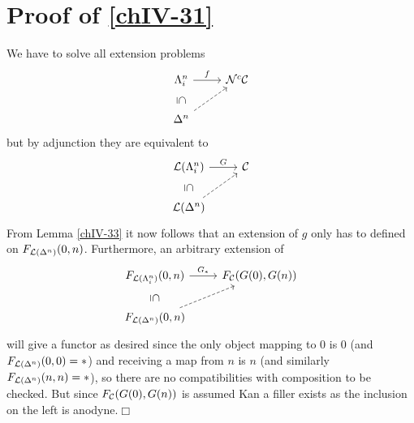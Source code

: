     \section{Proof of \ref{chIV-31}}
        We have to solve all extension problems
        \begin{equation*}
              \begin{tikzcd}
                \horn{n}{i} \arrow[r, "f"] \arrow[d, phantom, "\subseteq" rotate=-90] & \Nn^c \Cc \\
                \Delta^n \arrow[ru, dashed]           &        
            \end{tikzcd}
        \end{equation*}
        but by adjunction they are equivalent to
        \begin{equation*}
              \begin{tikzcd}
                \Ll(\horn{n}{i}) \arrow[r, "G"] \arrow[d, phantom, "\subseteq" rotate=-90] & \Cc \\
                \Ll(\Delta^n) \arrow[ru, dashed]           &        
            \end{tikzcd}
        \end{equation*}
        From Lemma \ref{chIV-33} it now follows that an extension of $g$ only has to defined on $F_{\mathcal{L}(\Delta^n)}(0,n)$. Furthermore, an arbitrary extension of
        \begin{equation*}
              \begin{tikzcd}
                F_{\Ll(\horn{n}{i})}(0, n) \arrow[r, "G_{*}"] \arrow[d, phantom, "\subseteq" rotate=-90] & F_{\Cc}(G(0), G(n)) \\
                F_{\Ll(\Delta^n)}(0, n) \arrow[ru, dashed]           &        
            \end{tikzcd}
        \end{equation*}
        will give a functor as desired since the only object mapping to $0$ is $0$ (and $F_{\mathcal{L}(\Delta^n)}(0, 0) = *$) and receiving a map from $n$ is $n$ (and similarly $F_{\mathcal{L}(\Delta^n)}(n, n) = *$), so there are no compatibilities with composition to be checked. But since $F_{\mathcal{C}}(G(0), G(n))$ is assumed Kan a filler exists as the inclusion on the left is anodyne.\hfill$\Box$        